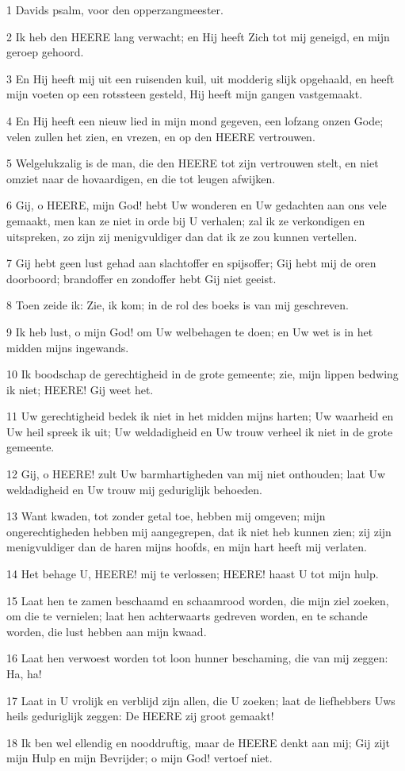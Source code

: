 \par 1 Davids psalm, voor den opperzangmeester.
\par 2 Ik heb den HEERE lang verwacht; en Hij heeft Zich tot mij geneigd, en mijn geroep gehoord.
\par 3 En Hij heeft mij uit een ruisenden kuil, uit modderig slijk opgehaald, en heeft mijn voeten op een rotssteen gesteld, Hij heeft mijn gangen vastgemaakt.
\par 4 En Hij heeft een nieuw lied in mijn mond gegeven, een lofzang onzen Gode; velen zullen het zien, en vrezen, en op den HEERE vertrouwen.
\par 5 Welgelukzalig is de man, die den HEERE tot zijn vertrouwen stelt, en niet omziet naar de hovaardigen, en die tot leugen afwijken.
\par 6 Gij, o HEERE, mijn God! hebt Uw wonderen en Uw gedachten aan ons vele gemaakt, men kan ze niet in orde bij U verhalen; zal ik ze verkondigen en uitspreken, zo zijn zij menigvuldiger dan dat ik ze zou kunnen vertellen.
\par 7 Gij hebt geen lust gehad aan slachtoffer en spijsoffer; Gij hebt mij de oren doorboord; brandoffer en zondoffer hebt Gij niet geeist.
\par 8 Toen zeide ik: Zie, ik kom; in de rol des boeks is van mij geschreven.
\par 9 Ik heb lust, o mijn God! om Uw welbehagen te doen; en Uw wet is in het midden mijns ingewands.
\par 10 Ik boodschap de gerechtigheid in de grote gemeente; zie, mijn lippen bedwing ik niet; HEERE! Gij weet het.
\par 11 Uw gerechtigheid bedek ik niet in het midden mijns harten; Uw waarheid en Uw heil spreek ik uit; Uw weldadigheid en Uw trouw verheel ik niet in de grote gemeente.
\par 12 Gij, o HEERE! zult Uw barmhartigheden van mij niet onthouden; laat Uw weldadigheid en Uw trouw mij geduriglijk behoeden.
\par 13 Want kwaden, tot zonder getal toe, hebben mij omgeven; mijn ongerechtigheden hebben mij aangegrepen, dat ik niet heb kunnen zien; zij zijn menigvuldiger dan de haren mijns hoofds, en mijn hart heeft mij verlaten.
\par 14 Het behage U, HEERE! mij te verlossen; HEERE! haast U tot mijn hulp.
\par 15 Laat hen te zamen beschaamd en schaamrood worden, die mijn ziel zoeken, om die te vernielen; laat hen achterwaarts gedreven worden, en te schande worden, die lust hebben aan mijn kwaad.
\par 16 Laat hen verwoest worden tot loon hunner beschaming, die van mij zeggen: Ha, ha!
\par 17 Laat in U vrolijk en verblijd zijn allen, die U zoeken; laat de liefhebbers Uws heils geduriglijk zeggen: De HEERE zij groot gemaakt!
\par 18 Ik ben wel ellendig en nooddruftig, maar de HEERE denkt aan mij; Gij zijt mijn Hulp en mijn Bevrijder; o mijn God! vertoef niet.

